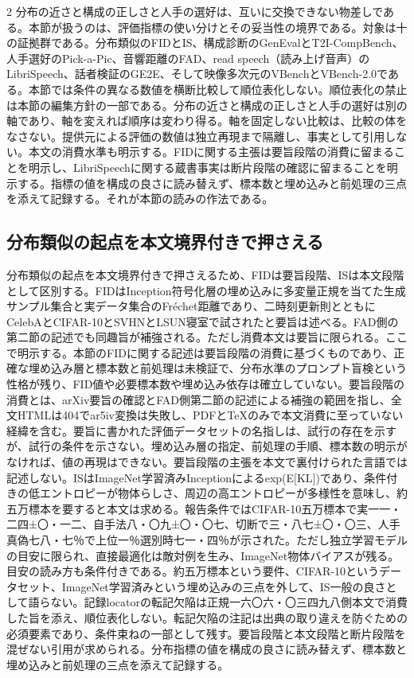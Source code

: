 \documentclass[lualatex,a4paper,10pt]{jlreq}
\begin{document}
\begin{multicols}{2}
\raggedcolumns
分布の近さと構成の正しさと人手の選好は、互いに交換できない物差しである。本節が扱うのは、評価指標の使い分けとその妥当性の境界である。対象は十の証拠群である。分布類似のFIDとIS、構成診断のGenEvalとT2I-CompBench、人手選好のPick-a-Pic、音響距離のFAD、read speech（読み上げ音声）のLibriSpeech、話者検証のGE2E、そして映像多次元のVBenchとVBench-2.0である\autocite{btd083,btd084,btd085,btd086,btd087,btd088,btd089,btd090,btd092,btd093}。本節では条件の異なる数値を横断比較して順位表化しない\autocite{btd085,btd086,btd092}。順位表化の禁止は本節の編集方針の一部である。分布の近さと構成の正しさと人手の選好は別の軸であり、軸を変えれば順序は変わり得る。軸を固定しない比較は、比較の体をなさない。提供元による評価の数値は独立再現まで隔離し、事実として引用しない。本文の消費水準も明示する。FIDに関する主張は要旨段階の消費に留まることを明示し、LibriSpeechに関する蔵書事実は断片段階の確認に留まることを明示する。指標の値を構成の良さに読み替えず、標本数と埋め込みと前処理の三点を添えて記録する。それが本節の読みの作法である\autocite{btd083,btd089}。

\subsection{分布類似の起点を本文境界付きで押さえる}
分布類似の起点を本文境界付きで押さえるため、FIDは要旨段階、ISは本文段階として区別する。FIDはInception符号化層の埋め込みに多変量正規を当てた生成サンプル集合と実データ集合のFréchet距離であり、二時刻更新則とともにCelebAとCIFAR-10とSVHNとLSUN寝室で試されたと要旨は述べる。FAD側の第二節の記述でも同趣旨が補強される。ただし消費本文は要旨に限られる。ここで明示する。本節のFIDに関する記述は要旨段階の消費に基づくものであり、正確な埋め込み層と標本数と前処理は未検証で、分布水準のプロンプト盲検という性格が残り、FID値や必要標本数や埋め込み依存は確立していない\autocite{btd083}。要旨段階の消費とは、arXiv要旨の確認とFAD側第二節の記述による補強の範囲を指し、全文HTMLは404でar5iv変換は失敗し、PDFとTeXのみで本文消費に至っていない経緯を含む。要旨に書かれた評価データセットの名指しは、試行の存在を示すが、試行の条件を示さない。埋め込み層の指定、前処理の手順、標本数の明示がなければ、値の再現はできない\autocite{btd083}。要旨段階の主張を本文で裏付けられた言語では記述しない。ISはImageNet学習済みInceptionによるexp(E[KL])であり、条件付きの低エントロピーが物体らしさ、周辺の高エントロピーが多様性を意味し、約五万標本を要すると本文は求める。報告条件ではCIFAR-10五万標本で実一一・二四±〇・一二、自手法八・〇九±〇・〇七、切断で三・八七±〇・〇三、人手真偽七八・七％で上位一％選別時七一・四％が示された\autocite{btd084}。ただし独立学習モデルの目安に限られ、直接最適化は敵対例を生み、ImageNet物体バイアスが残る\autocite{btd084}。目安の読み方も条件付きである。約五万標本という要件、CIFAR-10というデータセット、ImageNet学習済みという埋め込みの三点を外して、IS一般の良さとして語らない。記録locatorの転記欠陥は正規一六〇六・〇三四九八側本文で消費した旨を添え、順位表化しない。転記欠陥の注記は出典の取り違えを防ぐための必須要素であり、条件束ねの一部として残す\autocite{btd084}。要旨段階と本文段階と断片段階を混ぜない引用が求められる。分布指標の値を構成の良さに読み替えず、標本数と埋め込みと前処理の三点を添えて記録する\autocite{btd083,btd084}。


\end{multicols}
\end{document}
